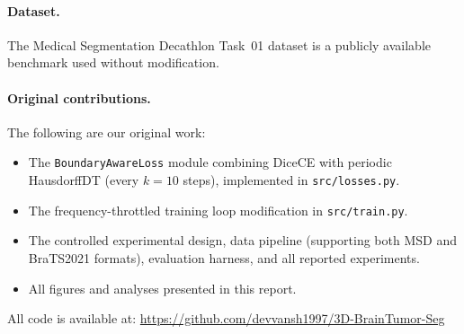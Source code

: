 \documentclass[12pt, letterpaper]{article}
\begin{document}
\paragraph{Dataset.}
The Medical Segmentation Decathlon Task~01 dataset \cite{antonelli2022}
is a publicly available benchmark used without modification.

\paragraph{Original contributions.}
The following are our original work:
\begin{itemize}[leftmargin=*]
    \item The \texttt{BoundaryAwareLoss} module combining DiceCE with
          periodic HausdorffDT (every $k=10$ steps), implemented in
          \texttt{src/losses.py}.
    \item The frequency-throttled training loop modification in
          \texttt{src/train.py}.
    \item The controlled experimental design, data pipeline
          (supporting both MSD and BraTS2021 formats), evaluation harness,
          and all reported experiments.
    \item All figures and analyses presented in this report.
\end{itemize}

All code is available at:
\url{https://github.com/devvansh1997/3D-BrainTumor-Seg}



\end{document}
